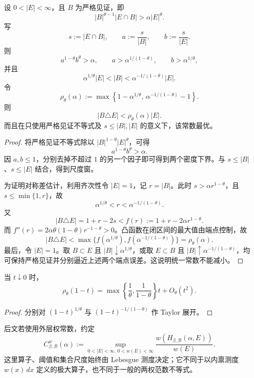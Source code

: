 \begin{theorem}[双密度刚性与最佳代数误差]
\label{fnd:double-density}
设 $0<|E|<\infty$，且 $B$ 为严格见证，即
\[
 |B|^{\theta-1}|E\cap B|>\alpha|E|^\theta.
\]
写
\[
 s:=|E\cap B|,\qquad a:=\frac{s}{|B|},\qquad b:=\frac{s}{|E|}.
\]
则
\[
 a^{1-\theta}b^\theta>\alpha,\qquad
 a>\alpha^{1/(1-\theta)},\qquad b>\alpha^{1/\theta},
\]
并且
\[
 \alpha^{1/\theta}|E|<|B|<\alpha^{-1/(1-\theta)}|E|.
\]
令
\[
 \rho_\theta(\alpha):=
 \max\left\{1-\alpha^{1/\theta},\,
 \alpha^{-1/(1-\theta)}-1\right\}.
\]
则
\[
 |B\triangle E|<\rho_\theta(\alpha)|E|.
\]
而且在只使用严格见证不等式及 $s\leq |B|,|E|$ 的意义下，该常数最优。
\end{theorem}

\begin{proof}
将严格见证不等式除以 $|B|^{1-\theta}|E|^\theta$，可得
\[
 a^{1-\theta}b^\theta>\alpha.
\]
因 $a,b\leq1$，分别去掉不超过 $1$ 的另一个因子即可得到两个密度下界。与 $s\leq|B|$、$s\leq|E|$ 结合，得到尺度窗。

为证明对称差估计，利用齐次性令 $|E|=1$，记 $r=|B|$。此时
$s>\alpha r^{1-\theta}$，且 $s\leq\min\{1,r\}$，故
\[
 \alpha^{1/\theta}<r<\alpha^{-1/(1-\theta)}.
\]
又
\[
 |B\triangle E|=1+r-2s
 <f(r):=1+r-2\alpha r^{1-\theta}.
\]
而 $f''(r)=2\alpha\theta(1-\theta)r^{-1-\theta}>0$。凸函数在闭区间的最大值由端点控制，故
\[
 |B\triangle E|<
 \max\{f(\alpha^{1/\theta}),f(\alpha^{-1/(1-\theta)})\}
 =\rho_\theta(\alpha).
\]
最后，令 $|E|=1$。取 $B\subset E$ 且 $|B|\downarrow\alpha^{1/\theta}$，或取 $E\subset B$ 且 $|B|\uparrow\alpha^{-1/(1-\theta)}$，均可保持严格见证并分别逼近上述两个端点误差。这说明统一常数不能减小。
\end{proof}

\begin{corollary}[端点展开]
\label{fnd:rho-expansion}
当 $t\downarrow0$ 时，
\[
 \rho_\theta(1-t)=
 \max\left\{\frac1\theta,\frac1{1-\theta}\right\}t+O_\theta(t^2).
\]
\end{corollary}

\begin{proof}
分别对 $(1-t)^{1/\theta}$ 与 $(1-t)^{-1/(1-\theta)}$ 作 Taylor 展开。
\end{proof}

\begin{remark}
\label{fnd:outer-weight}
后文若使用外层权常数，约定
\[
 C^w_{\beta,\mathcal B}(\alpha):=
 \sup_{0<|E|<\infty,\,0<w(E)<\infty}
 \frac{w(H_{\beta,\mathcal B}(\alpha,E))}{w(E)}.
\]
这里算子、阈值和集合尺度始终由 Lebesgue 测度决定；它不同于以内禀测度 $w(x)\,dx$ 定义的极大算子，也不同于一般的两权范数不等式。
\end{remark}
